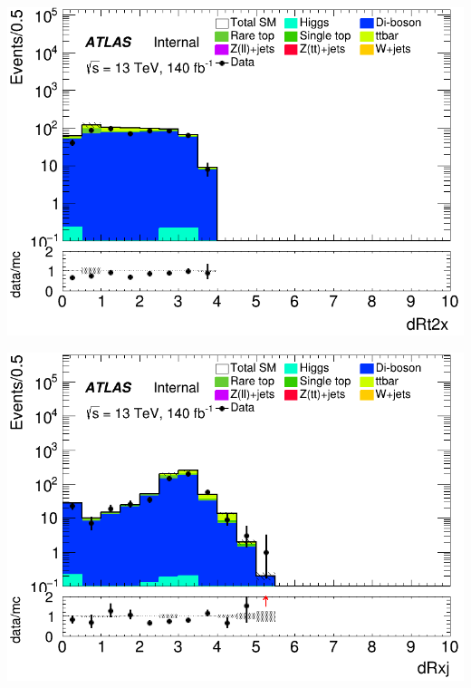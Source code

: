 \documentclass[usenames,dvipsnames]{beamer}
\begin{document}
\begin{frame}
    \begin{minipage}{0.32\textwidth}
        \centering
        \includegraphics[width=\textwidth]{graphics/LLL_met/LLL_met_dRt2x.png}
    \end{minipage}
    \hfill
    \begin{minipage}{0.32\textwidth}
        \centering
        \includegraphics[width=\textwidth]{graphics/LLL_met/LLL_met_dRxj.png}
    \end{minipage}
    \hfill
    \begin{minipage}{0.32\textwidth}
        \centering

\end{minipage}
\end{frame}
\end{document}
